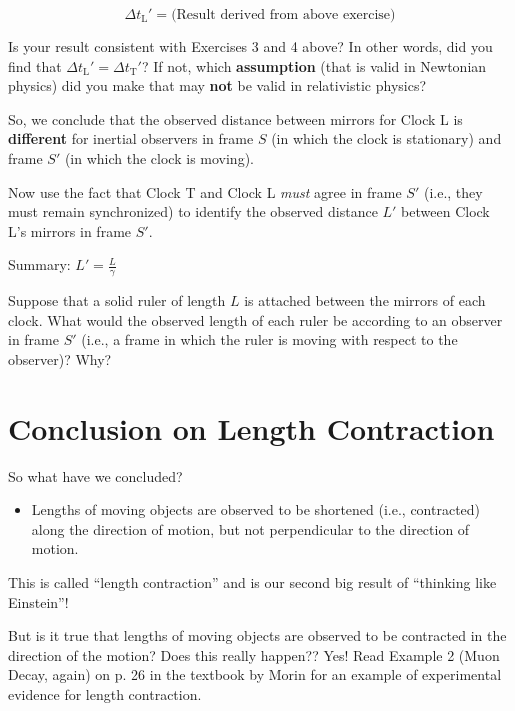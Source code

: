 \documentclass[11pt, letterpaper, openany]{book}
\newenvironment{exercise}[1][Exercise]{%
  \tcolorbox[blanker, breakable, left=1em,
    before skip=1em, after skip=1em,
    borderline west={3pt}{0pt}{PhysNavy},
    colback=PhysCream,
    before upper={\textcolor{PhysNavy}{\sffamily\bfseries #1:}\space}
  ]%
}{%
  \endtcolorbox%
}
\begin{document}
\[ \Delta t_{\text{L}}' = \text{(Result derived from above exercise)} \]

\begin{exercise}[Exercise 6]
Is your result consistent with Exercises 3 and 4 above? In other words, did you find that $\Delta t_{\text{L}}' = \Delta t_{\text{T}}'$? If not, which \textbf{assumption} (that is valid in Newtonian physics) did you make that may \textbf{not} be valid in relativistic physics?
\end{exercise}

So, we conclude that the observed distance between mirrors for Clock L is \textbf{different} for inertial observers in frame $S$ (in which the clock is stationary) and frame $S'$ (in which the clock is moving).

\begin{exercise}[Exercise 7]
Now use the fact that Clock T and Clock L \textit{must} agree in frame $S'$ (i.e., they must remain synchronized) to identify the observed distance $L'$ between Clock L's mirrors in frame $S'$.
\end{exercise}

\begin{center}
Summary: $L' = \frac{L}{\gamma}$
\end{center}

\begin{exercise}[Exercise 8]
Suppose that a solid ruler of length $L$ is attached between the mirrors of each clock. What would the observed length of each ruler be according to an observer in frame $S'$ (i.e., a frame in which the ruler is moving with respect to the observer)? Why?
\end{exercise}

\section{Conclusion on Length Contraction}
So what have we concluded?
\begin{itemize}
    \item Lengths of moving objects are observed to be shortened (i.e., contracted) along the direction of motion, but not perpendicular to the direction of motion.
\end{itemize}

This is called ``length contraction'' and is our second big result of ``thinking like Einstein''!

But is it true that lengths of moving objects are observed to be contracted in the direction of the motion? Does this really happen?? Yes! Read Example 2 (Muon Decay, again) on p. 26 in the textbook by Morin for an example of experimental evidence for length contraction.
\end{document}

